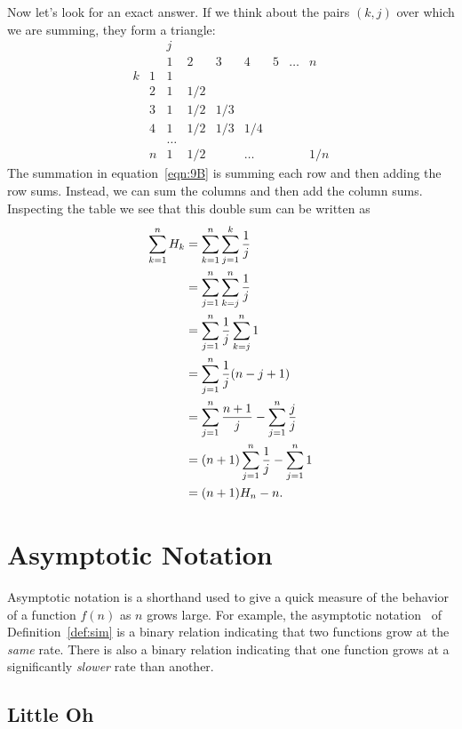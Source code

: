 Now let's look for an exact answer.  If we think about the pairs
$(k,j)$ over which we are summing, they form a triangle:
\[
\begin{array}{cc|ccccccc}
 &  & j &   &   &   &   &       &   \\
 &  & 1 & 2 & 3 & 4 & 5 & \dots & n \\
\hline
k & 1 & 1\\
  & 2 &1&1/2\\
  & 3 &1&1/2&1/3\\
  & 4 &1&1/2&1/3&1/4\\
  &   &\dots\\
  & n &1&1/2&&\dots&&&1/n
\end{array}
\]
The summation in equation~\ref{eqn:9B} is summing each row and then
adding the row sums.  Instead, we can sum the columns and then add the
column sums.  Inspecting the table we see that this double sum can be
written as
\begingroup
{}
\begin{align}
\sum_{k=1}^n H_k &= \sum_{k=1}^n \sum_{j=1}^k \frac{1}{j}\notag\\
&= \sum_{j=1}^n \sum_{k=j}^n \frac{1}{j}\notag\\
&= \sum_{j=1}^n \frac{1}{j} \sum_{k=j}^n 1\notag\\
&= \sum_{j=1}^n \frac1j (n-j+1)\notag\\
&= \sum_{j=1}^n \frac{n+1}j - \sum_{j=1}^n \frac{j}{j}\notag\\
&= (n+1)\sum_{j=1}^n \frac1j - \sum_{j=1}^n 1\notag\\
&= (n+1)H_n-n.\label{sHk}
\end{align}
\endgroup


\section{Asymptotic Notation}\label{asymptotic_sec}

Asymptotic notation is a shorthand used to give a quick measure of the
behavior of a function $f(n)$ as $n$ grows large.  For example, the
asymptotic notation~\idx{$\sim$} of Definition~\ref{def:sim} is a
binary relation indicating that two functions grow at the \emph{same}
rate.  There is also a binary relation indicating that one function
grows at a significantly \emph{slower} rate than another.


\subsection{Little Oh}


